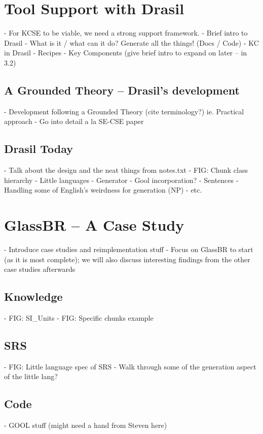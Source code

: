 \documentclass{llncs}
\begin{document}
\section{Tool Support with Drasil}
 - For KCSE to be viable, we need a strong support framework.
 - Brief intro to Drasil
  - What is it / what can it do? Generate all the things! (Docs / Code)
  - KC in Drasil
  - Recipes
  - Key Components (give brief intro to expand on later -- in 3.2)

\subsection{A Grounded Theory -- Drasil's development}
 - Development following a Grounded Theory (cite terminology?) ie. Practical approach
 - Go into detail a la SE-CSE paper

\subsection{Drasil Today}
 - Talk about the design and the neat things from notes.txt
 - FIG: Chunk class hierarchy
 - Little languages
 - Generator
 - Gool incorporation?
 - Sentences
 - Handling some of English's weirdness for generation (NP)
 - etc.

\section{GlassBR -- A Case Study}
 - Introduce case studies and reimplementation stuff
 - Focus on GlassBR to start (as it is most complete); we will also discuss
    interesting findings from the other case studies afterwards

\subsection{Knowledge}
 - FIG: SI\_Units
 - FIG: Specific chunks example

\subsection{SRS}
 - FIG: Little language spec of SRS
  - Walk through some of the generation aspect of the little lang?

\subsection{Code}
 - GOOL stuff (might need a hand from Steven here)
\end{document}
